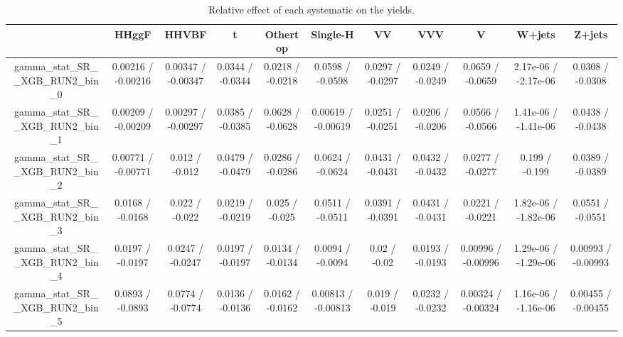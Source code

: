 \documentclass[10pt]{article}
\begin{document}
\begin{table}[htbp]
\begin{center}
\begin{tabular}{|c|c|c|c|c|c|c|c|c|c|c|}
\hline 
      & HHggF      & HHVBF      & t      & Othertop      & Single-H      & VV      & VVV      & V      & W+jets      & Z+jets \\ 
\hline 
  gamma_stat_SR__XGB_RUN2_bin_0 & 0.00216 / -0.00216 & 0.00347 / -0.00347 & 0.0344 / -0.0344 & 0.0218 / -0.0218 & 0.0598 / -0.0598 & 0.0297 / -0.0297 & 0.0249 / -0.0249 & 0.0659 / -0.0659 & 2.17e-06 / -2.17e-06 & 0.0308 / -0.0308 \\ 
  gamma_stat_SR__XGB_RUN2_bin_1 & 0.00209 / -0.00209 & 0.00297 / -0.00297 & 0.0385 / -0.0385 & 0.0628 / -0.0628 & 0.00619 / -0.00619 & 0.0251 / -0.0251 & 0.0206 / -0.0206 & 0.0566 / -0.0566 & 1.41e-06 / -1.41e-06 & 0.0438 / -0.0438 \\ 
  gamma_stat_SR__XGB_RUN2_bin_2 & 0.00771 / -0.00771 & 0.012 / -0.012 & 0.0479 / -0.0479 & 0.0286 / -0.0286 & 0.0624 / -0.0624 & 0.0431 / -0.0431 & 0.0432 / -0.0432 & 0.0277 / -0.0277 & 0.199 / -0.199 & 0.0389 / -0.0389 \\ 
  gamma_stat_SR__XGB_RUN2_bin_3 & 0.0168 / -0.0168 & 0.022 / -0.022 & 0.0219 / -0.0219 & 0.025 / -0.025 & 0.0511 / -0.0511 & 0.0391 / -0.0391 & 0.0431 / -0.0431 & 0.0221 / -0.0221 & 1.82e-06 / -1.82e-06 & 0.0551 / -0.0551 \\ 
  gamma_stat_SR__XGB_RUN2_bin_4 & 0.0197 / -0.0197 & 0.0247 / -0.0247 & 0.0197 / -0.0197 & 0.0134 / -0.0134 & 0.0094 / -0.0094 & 0.02 / -0.02 & 0.0193 / -0.0193 & 0.00996 / -0.00996 & 1.29e-06 / -1.29e-06 & 0.00993 / -0.00993 \\ 
  gamma_stat_SR__XGB_RUN2_bin_5 & 0.0893 / -0.0893 & 0.0774 / -0.0774 & 0.0136 / -0.0136 & 0.0162 / -0.0162 & 0.00813 / -0.00813 & 0.019 / -0.019 & 0.0232 / -0.0232 & 0.00324 / -0.00324 & 1.16e-06 / -1.16e-06 & 0.00455 / -0.00455 \\ 
\hline 
\end{tabular} 
\caption{Relative effect of each systematic on the yields.} 
\end{center} 
\end{table} 
\end{document}
